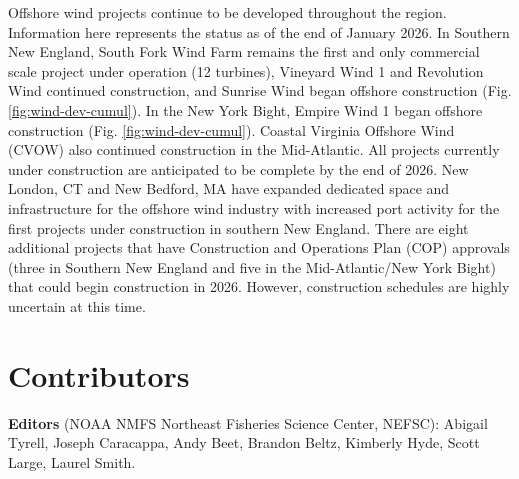 \documentclass[
  10pt,
]{article}
\begin{document}
Offshore wind projects continue to be developed throughout the region. Information here represents the status as of the end of January 2026. In Southern New England, South Fork Wind Farm remains the first and only commercial scale project under operation (12 turbines), Vineyard Wind 1 and Revolution Wind continued construction, and Sunrise Wind began offshore construction (Fig. \ref{fig:wind-dev-cumul}). In the New York Bight, Empire Wind 1 began offshore construction (Fig. \ref{fig:wind-dev-cumul}). Coastal Virginia Offshore Wind (CVOW) also continued construction in the Mid-Atlantic. All projects currently under construction are anticipated to be complete by the end of 2026. New London, CT and New Bedford, MA have expanded dedicated space and infrastructure for the offshore wind industry with increased port activity for the first projects under construction in southern New England. There are eight additional projects that have Construction and Operations Plan (COP) approvals (three in Southern New England and five in the Mid-Atlantic/New York Bight) that could begin construction in 2026. However, construction schedules are highly uncertain at this time.

\section{Contributors}\label{contributors}

\textbf{Editors} (NOAA NMFS Northeast Fisheries Science Center, NEFSC): Abigail Tyrell, Joseph Caracappa, Andy Beet, Brandon Beltz, Kimberly Hyde, Scott Large, Laurel Smith.
\end{document}

